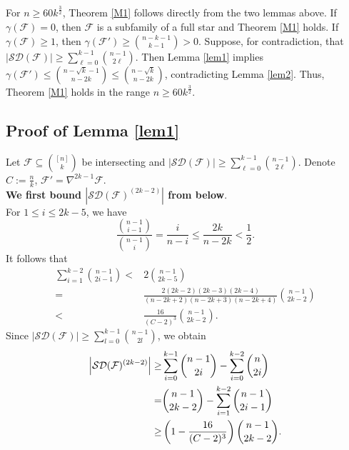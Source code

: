 \documentclass[11pt]{article}
\numberwithin{equation}{section}
\begin{document}
	
	
For  $n\ge 60k^\frac{3}{2}$,  Theorem \ref{M1} follows directly from the two lemmas above. 
 If $\gamma(\mathcal{F}) = 0$, then $\mathcal{F}$ is a subfamily of a full star and Theorem \ref{M1} holds.  If $\gamma(\mathcal{F}) \ge 1$, then $\gamma(\mathcal{F}') \ge \binom{n-k-1}{k-1} > 0$. 
Suppose, for contradiction, that  $|\mathcal{SD}(\mathcal{F})|\geq \sum\limits_{\ell=0}^{k-1}\binom{n-1}{2\ell}$. Then Lemma \ref{lem1} implies $\gamma(\mathcal{F}') \leq \binom{n-\sqrt{k}-1}{n-2k}\leq \binom{n-\sqrt{k}}{n-2k}$, contradicting Lemma \ref{lem2}. Thus, Theorem \ref{M1} holds in the range $n\ge 60k^\frac{3}{2}$.

    
	
	
	
	
	


    

    
	\subsection{Proof of Lemma \ref{lem1}}

	Let $\mathcal{F}\subseteq \binom{[n]}{k}$ be intersecting and $|\mathcal{SD}(\mathcal{F})|\geq \sum\limits_{\ell=0}^{k-1}\binom{n-1}{2\ell}.$ Denote $C:=\frac{n}{k}$, $\mathcal{F}' = \nabla^{2k-1} \mathcal{F}$. \\
    
    
    {\bf We first bound $ \left| \mathcal{SD}(\mathcal{F})^{(2k-2)} \right|$ from below}. 
    \\ 
    
    For $1 \le i \le 2k-5$, we have
	$$\frac{\binom{n-1}{i-1}}{\binom{n-1}{i}}=\frac{i}{n-i}\le\frac{2k}{n - 2k} < \frac{1}{2}.$$
	It follows that 
    \begin{align*}
    \sum_{i=1}^{k-2} \binom{n-1}{2i-1} <& 2\binom{n-1}{2k-5} \\
= & \frac{2(2k-2)(2k-3)(2k-4)}{(n-2k+2)(n-2k+3)(n-2k+4)} \binom{n-1}{2k-2}\\
    < &\frac{16}{(C-2)^3} \binom{n-1}{2k-2}.
    \end{align*}
Since $|\mathcal{SD}(\mathcal{F})|\geq \sum\limits_{l=0}^{k-1}\binom{n-1}{2l}$, we obtain
	\begin{align}
    \left| \mathcal{SD}(\mathcal{F})^{(2k-2)} \right|\geq &\sum_{i=0}^{k-1} \binom{n-1}{2i} - \sum_{i=0}^{k-2} \binom{n}{2i} \notag\\
    =& \binom{n-1}{2k-2}- \sum_{i=1}^{k-2} \binom{n-1}{2i-1} \notag\\
    \geq &\left( 1 - \frac{16}{(C-2)^3} \right) \binom{n-1}{2k-2}.\label{fo1}
	\end{align}
\end{document}
